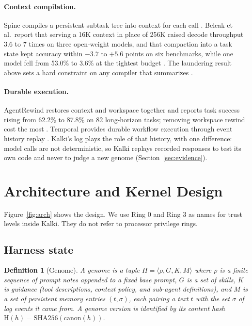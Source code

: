 \documentclass[11pt,a4paper]{article}
\newtheorem{definition}{Definition}
\begin{document}
\paragraph{Context compilation.} Spine compiles a persistent subtask tree into context for each call \citep{spine2026}. Belcak et al.\ report that serving a 16K context in place of 256K raised decode throughput 3.6 to 7 times on three open-weight models, and that compaction into a task state kept accuracy within $-3.7$ to $+5.6$ points on six benchmarks, while one model fell from 53.0\% to 3.6\% at the tightest budget \citep{belcak2026shortcontext}. The laundering result above sets a hard constraint on any compiler that summarizes \citep{dabirsiaghi2026laundering}.

\paragraph{Durable execution.} AgentRewind restores context and workspace together and reports task success rising from 62.2\% to 87.8\% on 82 long-horizon tasks; removing workspace rewind cost the most \citep{zhuang2026agentrewind}. Temporal provides durable workflow execution through event history replay \citep{temporal}. Kalki's log plays the role of that history, with one difference: model calls are not deterministic, so Kalki replays recorded responses to test its own code and never to judge a new genome (Section~\ref{sec:evidence}).

\section{Architecture and Kernel Design}
\label{sec:arch}

Figure~\ref{fig:arch} shows the design. We use Ring 0 and Ring 3 as names for trust levels inside Kalki. They do not refer to processor privilege rings.

\subsection{Harness state}

\begin{definition}[Genome]
A genome is a tuple $H=\langle\rho,G,K,M\rangle$ where $\rho$ is a finite sequence of prompt notes appended to a fixed base prompt, $G$ is a set of skills, $K$ is guidance (tool descriptions, context policy, and sub-agent definitions), and $M$ is a set of persistent memory entries $(t,\sigma)$, each pairing a text $t$ with the set $\sigma$ of log events it came from. A genome version is identified by its content hash $\mathrm{H}(h)=\mathrm{SHA256}(\mathrm{canon}(h))$.
\end{definition}
\end{document}
